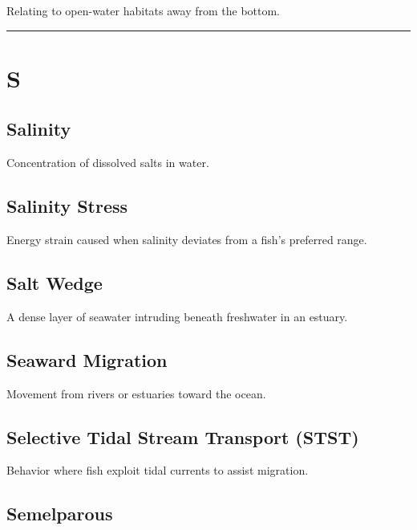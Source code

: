 \documentclass[
]{book}
\begin{document}
Relating to open-water habitats away from the bottom.

\begin{center}\rule{0.5\linewidth}{0.5pt}\end{center}

\section*{S}\label{s}

\subsection{\texorpdfstring{\textbf{Salinity}}{Salinity}}\label{salinity}

Concentration of dissolved salts in water.

\subsection{\texorpdfstring{\textbf{Salinity Stress}}{Salinity Stress}}\label{salinity-stress-1}

Energy strain caused when salinity deviates from a fish's preferred range.

\subsection{\texorpdfstring{\textbf{Salt Wedge}}{Salt Wedge}}\label{salt-wedge}

A dense layer of seawater intruding beneath freshwater in an estuary.

\subsection{\texorpdfstring{\textbf{Seaward Migration}}{Seaward Migration}}\label{seaward-migration-1}

Movement from rivers or estuaries toward the ocean.

\subsection{\texorpdfstring{\textbf{Selective Tidal Stream Transport (STST)}}{Selective Tidal Stream Transport (STST)}}\label{selective-tidal-stream-transport-stst}

Behavior where fish exploit tidal currents to assist migration.

\subsection{\texorpdfstring{\textbf{Semelparous}}{Semelparous}}\label{semelparous}
\end{document}
